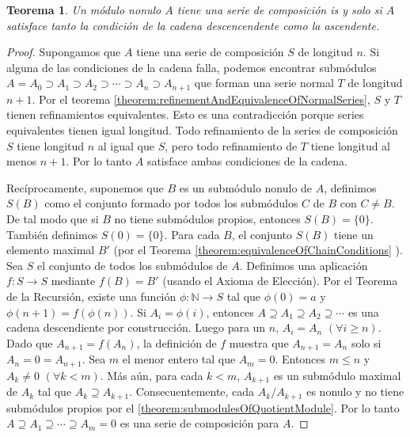 \documentclass{report}
\newcommand{\naturalNumbers}{\mathbb{N}}
\newtheorem{theorem}{Teorema}
\begin{document}
  \begin{theorem}
    Un módulo nonulo \(A\) tiene una serie de composición is y solo si \(A\) satisface tanto la condición de la cadena descencendente como la ascendente.
  \end{theorem}
  \begin{proof}
    Supongamos que \(A\) tiene una serie de composición \(S\) de longitud \(n\).
    Si alguna de las condiciones de la cadena falla, podemos encontrar submódulos \(A = A_0 \supset A_1 \supset A_2 \supset \cdots \supset A_n \supset A_{n + 1}\)
    que forman una serie normal \(T\) de longitud \(n + 1\).
    Por el teorema \ref{theorem:refinementAndEquivalenceOfNormalSeries}, \(S\) y \(T\) tienen refinamientos equivalentes.
    Esto es una contradicción porque series equivalentes tienen igual longitud.
    Todo refinamiento de la series de composición \(S\) tiene longitud \(n\) al igual que \(S\), pero todo refinamiento de \(T\) tiene longitud al menos \(n + 1\).
    Por lo tanto \(A\) satisface ambas condiciones de la cadena.

    Recíprocamente, suponemos que \(B\) es un submódulo nonulo de \(A\), definimos \(S(B)\) como el conjunto formado por todos los submódulos \(C\) de \(B\) con \(C \neq B\).
    De tal modo que si \(B\) no tiene submódulos propios, entonces \(S(B) = \{0\}\).
    También definimos \(S(0) = \{0\}\).
    Para cada \(B\), el conjunto \(S(B)\) tiene un elemento maximal \(B'\) (por el Teorema \ref{theorem:equivalenceOfChainConditions}
    ).
    Sea \(S\) el conjunto de todos los submódulos de \(A\).
    Definimos una aplicación \(f : S \rightarrow S\) mediante \(f(B) = B'\) (usando el Axioma de Elección).
    Por el Teorema de la Recursión, existe una función \(\phi : \naturalNumbers \rightarrow S\) tal que \(\phi(0) = a\) y \(\phi(n + 1) = f(\phi(n))\).
    Si \(A_i = \phi(i)\), entonces \(A \supseteq A_1 \supseteq A_2 \supseteq \cdots\) es una cadena descendiente por construcción.
    Luego para un \(n\), \(A_i = A_n\) \((\forall i \geq n)\).
    Dado que \(A_{n + 1} = f(A_n)\), la definición de \(f\) muestra que \(A_{n + 1} = A_n\) solo si \(A_n = 0 = A_{n + 1}\).
    Sea \(m\) el menor entero tal que \(A_m = 0\).
    Entonces \(m \leq n\) y \(A_k \neq 0\) \((\forall k < m)\).
    Más aún, para cada \(k < m\), \(A_{k + 1}\) es un submódulo maximal de \(A_k\) tal que \(A_k \supseteq A_{k + 1}\).
    Consecuentemente, cada \(A_k / A_{k + 1}\) es nonulo y no tiene submódulos propios por el \ref{theorem:submodulesOfQuotientModule}.
    Por lo tanto \(A \supseteq A_1 \supseteq \cdots \supseteq A_m = 0\) es una serie de composición para \(A\).
  \end{proof}
\end{document}

